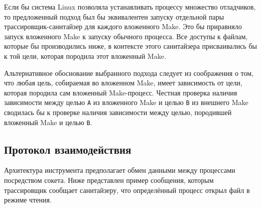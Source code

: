 Если бы система Linux позволяла устанавливать процессу множество отладчиков, то предложенный подход был бы эквивалентен запуску отдельной пары трассировщик-санитайзер для каждого вложенного Make. Это бы приравняло запуск вложенного Make к запуску обычного процесса. Все доступы к файлам, которые бы производились ниже, в контексте этого санитайзера присваивались бы к той цели, которая породила этот вложенный Make.

Альтернативное обоснование выбранного подхода следует из соображения о том, что любая цель, собираемая во вложенном Make, имеет зависимость от цели, которая породила сам вложенный Make-процесс. Честная проверка наличия зависимости между целью \texttt{A} из вложенного Make и целью \texttt{B} из внешнего Make сводилась бы к проверке наличия зависимости между целью, породившей вложенный Make и целью \texttt{B}.

\subsection{Протокол взаимодействия}
\label{subsec:pstree}

Архитектура инструмента предполагает обмен данными между процессами посредством сокета. Ниже представлен пример сообщения, которым трассировщик сообщает санитайзеру, что определённый процесс открыл файл в режиме чтения.

